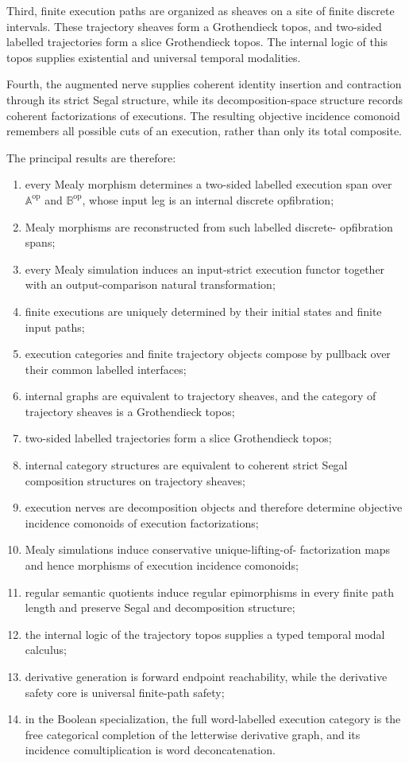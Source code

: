 Third, finite execution paths are organized as sheaves on a site of finite
discrete intervals. These trajectory sheaves form a Grothendieck topos, and
two-sided labelled trajectories form a slice Grothendieck topos. The internal
logic of this topos supplies existential and universal temporal modalities.

Fourth, the augmented nerve supplies coherent identity insertion and
contraction through its strict Segal structure, while its decomposition-space
structure records coherent factorizations of executions. The resulting
objective incidence comonoid remembers all possible cuts of an execution,
rather than only its total composite.

The principal results are therefore:
\begin{enumerate}
    \item every Mealy morphism determines a two-sided labelled execution span
    over \(\mathbb A^{\mathrm{op}}\) and
    \(\mathbb B^{\mathrm{op}}\), whose input leg is an internal discrete
    opfibration;
    \item Mealy morphisms are reconstructed from such labelled discrete-
    opfibration spans;
    \item every Mealy simulation induces an input-strict execution functor
    together with an output-comparison natural transformation;
    \item finite executions are uniquely determined by their initial states
    and finite input paths;
    \item execution categories and finite trajectory objects compose by
    pullback over their common labelled interfaces;
    \item internal graphs are equivalent to trajectory sheaves, and the
    category of trajectory sheaves is a Grothendieck topos;
    \item two-sided labelled trajectories form a slice Grothendieck topos;
    \item internal category structures are equivalent to coherent strict
    Segal composition structures on trajectory sheaves;
    \item execution nerves are decomposition objects and therefore determine
    objective incidence comonoids of execution factorizations;
    \item Mealy simulations induce conservative unique-lifting-of-
    factorization maps and hence morphisms of execution incidence comonoids;
    \item regular semantic quotients induce regular epimorphisms in every
    finite path length and preserve Segal and decomposition structure;
    \item the internal logic of the trajectory topos supplies a typed
    temporal modal calculus;
    \item derivative generation is forward endpoint reachability, while the
    derivative safety core is universal finite-path safety;
    \item in the Boolean specialization, the full word-labelled execution
    category is the free categorical completion of the letterwise derivative
    graph, and its incidence comultiplication is word deconcatenation.
\end{enumerate}

